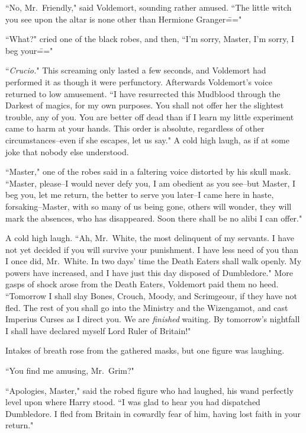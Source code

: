 ``No, Mr.~Friendly," said Voldemort, sounding rather amused. ``The little witch you see upon the altar is none other than Hermione Granger\==="

``What?" cried one of the black robes, and then, ``I'm sorry, Master, I'm sorry, I beg your\==="

``\emph{Crucio.}" This screaming only lasted a few seconds, and Voldemort had performed it as though it were perfunctory. Afterwards Voldemort's voice returned to low amusement. ``I have resurrected this Mudblood through the Darkest of magics, for my own purposes. You shall not offer her the slightest trouble, any of you. You are better off dead than if I learn my little experiment came to harm at your hands. This order is absolute, regardless of other circumstances\---even if she escapes, let us say." A cold high laugh, as if at some joke that nobody else understood.

``Master," one of the robes said in a faltering voice distorted by his skull mask. ``Master, please\---I would never defy you, I am obedient as you see\---but Master, I beg you, let me return, the better to serve you later\---I came here in haste, forsaking\---Master, with so many of us being gone, others will wonder, they will mark the absences, who has disappeared. Soon there shall be no alibi I can offer."

A cold high laugh. ``Ah, Mr.~White, the most delinquent of my servants. I have not yet decided if you will survive your punishment. I have less need of you than I once did, Mr.~White. In two days' time the Death Eaters shall walk openly. My powers have increased, and I have just this day disposed of Dumbledore." More gasps of shock arose from the Death Eaters, Voldemort paid them no heed. ``Tomorrow I shall slay Bones, Crouch, Moody, and Scrimgeour, if they have not fled. The rest of you shall go into the Ministry and the Wizengamot, and cast Imperius Curses as I direct you. We are \emph{finished} waiting. By tomorrow's nightfall I shall have declared myself Lord Ruler of Britain!"

Intakes of breath rose from the gathered masks, but one figure was laughing.

``You find me amusing, Mr.~Grim?"

``Apologies, Master," said the robed figure who had laughed, his wand perfectly level upon where Harry stood. ``I was glad to hear you had dispatched Dumbledore. I fled from Britain in cowardly fear of him, having lost faith in your return."

